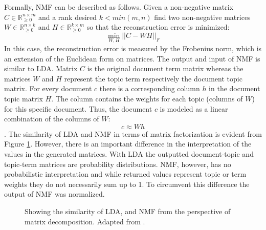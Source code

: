 Formally, \ac{NMF} can be described as follows. Given a non-negative matrix $C \in \mathbb{R}_{\geq 0}^{n\times m}$ and a rank desired $k < min(m,n)$ find two non-negative matrices $W \in \mathbb{R}_{\geq 0}^{n \times k}$ and $H \in \mathbb{R}_{\geq 0}^{k \times m}$ so that the reconstruction error is minimized:
\begin{equation}
\min_{W,H} ||C - WH||_F
\end{equation}
In this case, the reconstruction error is measured by the Frobenius norm, which is an extension of the Euclidean form on matrices. The output and input of \ac{NMF} is similar to \ac{LDA}. Matrix $C$ is the original document term matrix whereas the matrices $W$ and $H$ represent the topic term respectively the document topic matrix. For every document $c$ there is a corresponding column $h$ in the document topic matrix $H$. The column contains the weights for each topic (columns of $W$) for this specific document. Thus, the document $c$ is modeled as a linear combination of the columns of $W$:
\begin{equation}
c \approx Wh
\end{equation}.
The similarity of \ac{LDA} and \ac{NMF} in terms of matrix factorization is evident from Figure \ref{fig:comparison}. However, there is an important difference in the interpretation of  the values in the generated matrices. With \ac{LDA} the outputted document-topic and topic-term matrices are probability distributions. \ac{NMF}, however, has no probabilistic interpretation and while returned values represent topic or term weights they do not necessarily sum up to 1. To circumvent this difference the output of \ac{NMF} was normalized. 

\begin{figure} 
	\centering
	
	\caption[Similarity of LSA and NMF from the perspective of matrix decomposition]{Showing the similarity of \ac{LDA}, and \ac{NMF} from the perspective of matrix decomposition. Adapted from \cite{Steyvers2007a}.}
	\label{fig:comparison} 
\end{figure} 
